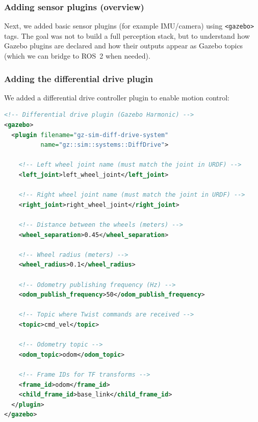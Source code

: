 \subsubsection{Adding sensor plugins (overview)}

Next, we added basic sensor plugins (for example IMU/camera) using \texttt{<gazebo>} tags. The goal was not to build a full perception stack, but to understand how Gazebo plugins are declared and how their outputs appear as Gazebo topics (which we can bridge to ROS~2 when needed).

\subsubsection{Adding the differential drive plugin}

We added a differential drive controller plugin to enable motion control:

\begin{lstlisting}[language=XML]
<!-- Differential drive plugin (Gazebo Harmonic) -->
<gazebo>
  <plugin filename="gz-sim-diff-drive-system" 
          name="gz::sim::systems::DiffDrive">

    <!-- Left wheel joint name (must match the joint in URDF) -->
    <left_joint>left_wheel_joint</left_joint>

    <!-- Right wheel joint name (must match the joint in URDF) -->
    <right_joint>right_wheel_joint</right_joint>

    <!-- Distance between the wheels (meters) -->
    <wheel_separation>0.45</wheel_separation>

    <!-- Wheel radius (meters) -->
    <wheel_radius>0.1</wheel_radius>

    <!-- Odometry publishing frequency (Hz) -->
    <odom_publish_frequency>50</odom_publish_frequency>

    <!-- Topic where Twist commands are received -->
    <topic>cmd_vel</topic>
    
    <!-- Odometry topic -->
    <odom_topic>odom</odom_topic>

    <!-- Frame IDs for TF transforms -->
    <frame_id>odom</frame_id>
    <child_frame_id>base_link</child_frame_id>
  </plugin>
</gazebo>
\end{lstlisting}

